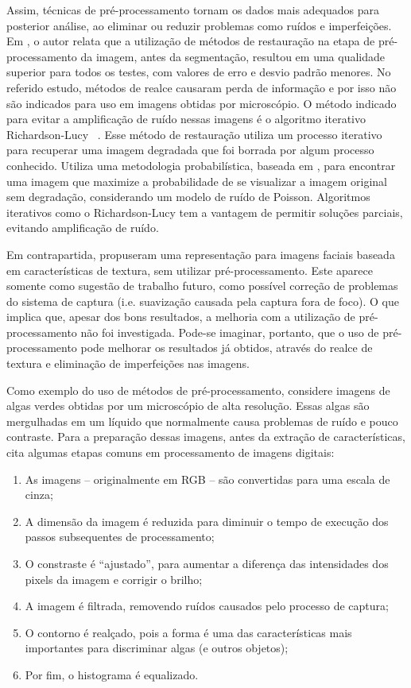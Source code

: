 Assim, técnicas de pré-processamento tornam os dados mais adequados para posterior análise, ao eliminar ou reduzir problemas como ruídos e imperfeições. Em , o autor relata que a utilização de métodos de restauração na etapa de pré-processamento da imagem, antes da segmentação, resultou em uma qualidade superior para todos os testes, com valores de erro e desvio padrão menores. No referido estudo, métodos de realce causaram perda de informação e por isso não são indicados para uso em imagens obtidas por microscópio. O método indicado para evitar a amplificação de ruído nessas imagens é o algoritmo iterativo Richardson-Lucy ~\cite{Ponti-Jr2011}. Esse método de restauração utiliza um processo iterativo para recuperar uma imagem degradada que foi borrada por algum processo conhecido. Utiliza uma metodologia probabilística, baseada em , para encontrar uma imagem que maximize a probabilidade de se visualizar a imagem original sem degradação, considerando um modelo de ruído de Poisson. Algoritmos iterativos como o Richardson-Lucy tem a vantagem de permitir soluções parciais, evitando amplificação de ruído.

Em contrapartida,  propuseram uma representação para imagens faciais baseada em características de textura, sem utilizar pré-processamento. Este aparece somente como sugestão de trabalho futuro, como possível correção de problemas do sistema de captura (i.e. suavização causada pela captura fora de foco). O que implica que, apesar dos bons resultados, a melhoria com a utilização de pré-processamento não foi investigada. Pode-se imaginar, portanto, que o uso de pré-processamento pode melhorar os resultados já obtidos, através do realce de textura e eliminação de imperfeições nas imagens.

Como exemplo do uso de métodos de pré-processamento, considere imagens de algas verdes obtidas por um microscópio de alta resolução. Essas algas são mergulhadas em um líquido que normalmente causa problemas de ruído e pouco contraste. Para a preparação dessas imagens, antes da extração de características,  cita algumas etapas comuns em processamento de imagens digitais:

\begin{enumerate}
\item As imagens -- originalmente em RGB -- são convertidas para uma escala de cinza;
\item A dimensão da imagem é reduzida para diminuir o tempo de execução dos passos subsequentes de processamento;
\item O constraste é ``ajustado'', para aumentar a diferença das intensidades dos pixels da imagem e corrigir o brilho;
\item A imagem é filtrada, removendo ruídos causados pelo processo de captura;
\item O contorno é realçado, pois a forma é uma das características mais importantes para discriminar algas (e outros objetos);
\item Por fim, o histograma é equalizado.
\end{enumerate}

